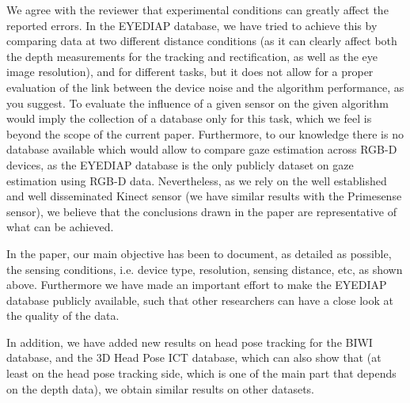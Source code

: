 {\vspace*{2mm}


We agree with the reviewer that experimental conditions can greatly affect the reported errors.
%
In the EYEDIAP database, we have tried to  achieve this by comparing data at two different distance conditions
(as it can clearly affect both the depth measurements for the tracking and rectification, as well as the eye image resolution),
and for different tasks,
but it does not allow for a proper evaluation of the link between the device noise and the algorithm performance, as you suggest.
%
To evaluate the influence of a given sensor on the given algorithm would imply the collection of a database only for this task,
which we feel is beyond the scope of the current paper.
%
Furthermore, to our knowledge there is no database available which would allow to compare gaze estimation across RGB-D devices,
as the EYEDIAP database is the only publicly dataset on gaze estimation using RGB-D data.
%
Nevertheless, as we rely on the well established and well disseminated Kinect sensor (we have similar results with the Primesense sensor), we believe that the conclusions
drawn in the paper are representative of what can be achieved.

\qquad


In the paper, our main objective has been to document, as detailed as possible, the sensing conditions, i.e. device type, resolution, sensing distance, etc, as shown above.
Furthermore we have made an important effort to make the EYEDIAP database publicly available,  such that other researchers can have a close
look at the quality of the data.


In addition, we have added new results on head pose tracking for the BIWI database, and the 3D Head Pose ICT database, which can also show that (at least on the head pose
tracking side, which is one of the main part that depends on the depth data), we obtain similar results on other datasets.


}
